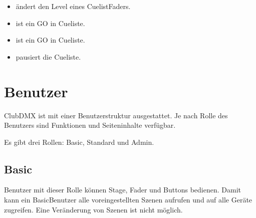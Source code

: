 \documentclass[letterpaper,10pt,ngerman]{sphinxmanual}
\begin{document}
\begin{itemize}
\item {} 
 ändert den Level eines Cuelist\sphinxhyphen{}Faders.

\item {} 
 ist ein GO in Cueliste.

\item {} 
 ist ein GO in Cueliste.

\item {} 
 pausiert die Cueliste.


\end{itemize}


\chapter{Benutzer}
\label{\detokenize{benutzer:benutzer}}\label{\detokenize{benutzer:benutzer-label}}\label{\detokenize{benutzer::doc}}
ClubDMX ist mit einer Benutzerstruktur ausgestattet. Je nach Rolle des
Benutzers sind Funktionen und Seiteninhalte verfügbar.

Es gibt drei Rollen: Basic, Standard und Admin.


\section{Basic}
\label{\detokenize{benutzer:basic}}
Benutzer mit dieser Rolle können Stage, Fader und Buttons bedienen. Damit
kann ein Basic\sphinxhyphen{}Benutzer alle voreingestellten Szenen aufrufen und auf
alle Geräte zugreifen. Eine Veränderung von Szenen ist nicht möglich.
\end{document}
